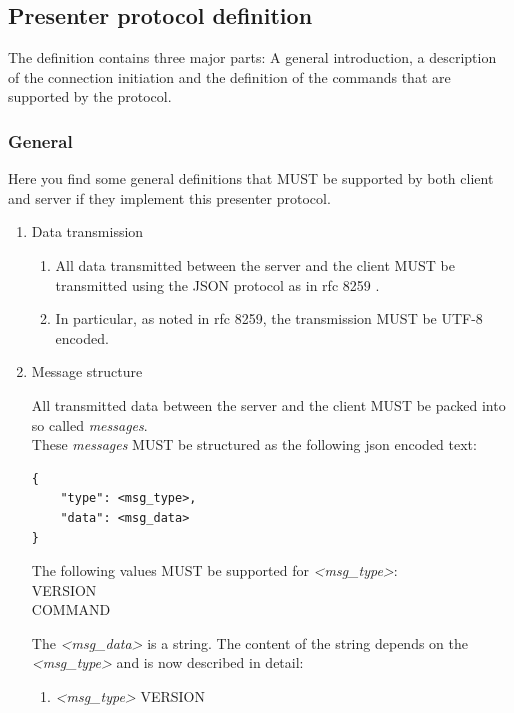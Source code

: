 \documentclass{article}
\begin{document}
\subsection{Presenter protocol definition}

The definition contains three major parts: A general introduction, a description of the connection initiation and the definition of the commands that are supported by the protocol.

\subsubsection{General}

Here you find some general definitions that MUST be supported by both client and server if they implement this presenter protocol.

\begin{enumerate}
    \item Data transmission

        \begin{enumerate}
           \item All data transmitted between the server and the client MUST be transmitted using the JSON protocol as in rfc 8259 \cite{JSON}.
           \item In particular, as noted in rfc 8259, the transmission MUST be UTF-8 encoded.
        \end{enumerate}
    \item Message structure

        All transmitted data between the server and the client MUST be packed into so called \emph{messages}.\\
        These \emph{messages} MUST be structured as the following json encoded text:
\begin{verbatim}
{
    "type": <msg_type>,
    "data": <msg_data>
}
\end{verbatim}

        The following values MUST be supported for \emph{\textless{}msg\_type\textgreater{}}:\\
        VERSION\\
        COMMAND

        The \emph{\textless{}msg\_data\textgreater{}} is a string. The content of the string depends on the \emph{\textless{}msg\_type\textgreater{}} and is now described in detail:

\newpage

        \begin{enumerate}
            \item \emph{\textless{}msg\_type\textgreater{}} VERSION
                \label{msg_version}


\end{enumerate}
\end{enumerate}
\end{document}
